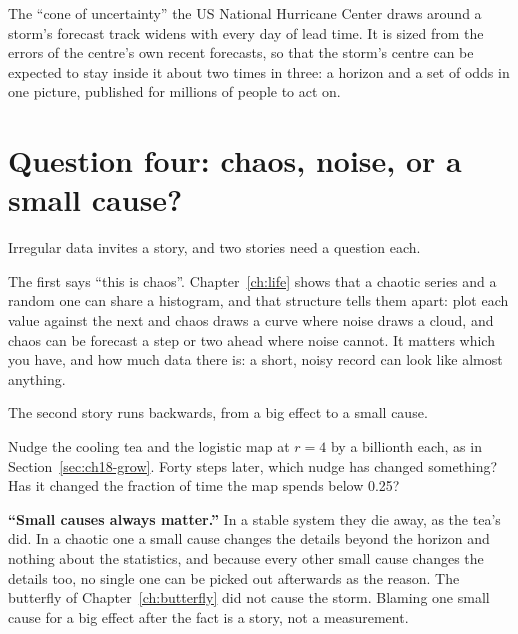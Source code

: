 \begin{worldbox}
The \enquote{cone of uncertainty} the US National Hurricane Center draws
around a storm's forecast track widens with every day of lead time. It is
sized from the errors of the centre's own recent forecasts, so that the
storm's centre can be expected to stay inside it about two times in three:
a horizon and a set of odds in one picture, published for millions of
people to act on.
\end{worldbox}

\section{Question four: chaos, noise, or a small cause?}
\label{sec:ch18-noise}

\noindent
Irregular data invites a story, and two stories need a question each.

The first says \enquote{this is chaos}. Chapter~\ref{ch:life} shows that a
chaotic series and a random one can share a histogram, and that structure
tells them apart: plot each value against the next and chaos draws a curve
where noise draws a cloud, and chaos can be forecast a step or two ahead
where noise cannot. It matters which you have, and how much data there is:
a short, noisy record can look like almost anything.

The second story runs backwards, from a big effect to a small cause.

\begin{think}
Nudge the cooling tea and the logistic map at $r = 4$ by a billionth each,
as in Section~\ref{sec:ch18-grow}. Forty steps later, which nudge has
changed something? Has it changed the fraction of time the map spends below
\num{0.25}?
\end{think}

\begin{trapbox}
\textbf{\enquote{Small causes always matter.}} In a stable system they die
away, as the tea's did. In a chaotic one a small cause changes the details
beyond the horizon and nothing about the statistics, and because every
other small cause changes the details too, no single one can be picked out
afterwards as the reason. The butterfly of Chapter~\ref{ch:butterfly} did
not cause the storm. Blaming one small cause for a big effect after the
fact is a story, not a measurement.
\end{trapbox}

